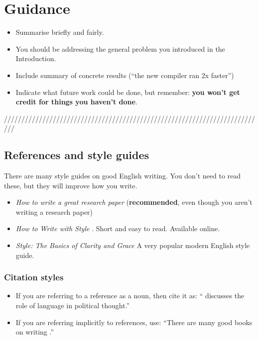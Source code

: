 \documentclass{l4proj}
\begin{document}
\section{Guidance}
\begin{itemize}
    \item
        Summarise briefly and fairly.
    \item
        You should be addressing the general problem you introduced in the
        Introduction.        
    \item
        Include summary of concrete results (``the new compiler ran 2x
        faster'')
    \item
        Indicate what future work could be done, but remember: \textbf{you
        won't get credit for things you haven't done}.
\end{itemize}


///////////////////////////////////////////////////////////////////////////

\subsection{References and style guides}
There are many style guides on good English writing. You don't need to
read these, but they will improve how you write.

\begin{itemize}
    \item
    \emph{How to write a great research paper} \cite{Pey17} (\textbf{recommended}, even though you aren't writing a research paper)
    \item
    \emph{How to Write with Style} \cite{Von80}. Short and easy to read. Available online.
    \item
    \emph{Style: The Basics of Clarity and Grace} \cite{Wil09} A very popular modern English style guide.
\end{itemize}

\subsubsection{Citation styles}

\begin{itemize}
\item If you are referring to a reference as a noun, then cite it as: ``\citet{Orw68} discusses the role of language in political thought.''
\item If you are referring implicitly to references, use: ``There are many good books on writing \citep{Orw68, Wil09, Pin15}.''
\end{itemize}
\end{document}
